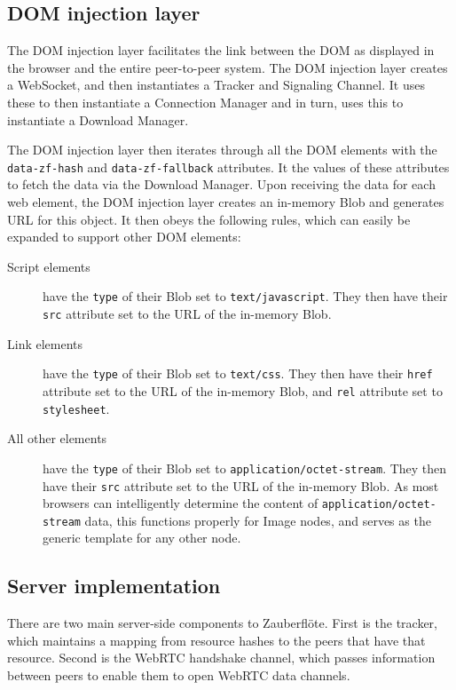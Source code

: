 \documentclass[letterpaper,twocolumn,10pt]{article}
\newcommand{\zbf}{Zauberfl\"{o}te\xspace}
\begin{document}
\subsection{DOM injection layer}
The DOM injection layer facilitates the link between the DOM as displayed in the browser and the entire peer-to-peer system. The DOM injection layer creates a WebSocket, and then instantiates a Tracker and Signaling Channel. It uses these to then instantiate a Connection Manager and in turn, uses this to instantiate a Download Manager.

The DOM injection layer then iterates through all the DOM elements with the \texttt{data-zf-hash} and \texttt{data-zf-fallback} attributes. It the values of these attributes to fetch the data via the Download Manager. Upon receiving the data for each web element, the DOM injection layer creates an in-memory Blob and generates URL for this object. It then obeys the following rules, which can easily be expanded to support other DOM elements:

\begin{description}
\item[Script elements] have the \texttt{type} of their Blob set to \texttt{text/javascript}. They then have their \texttt{src} attribute set to the URL of the in-memory Blob.
\item[Link elements] have the \texttt{type} of their Blob set to \texttt{text/css}. They then have their \texttt{href} attribute set to the URL of the in-memory Blob, and \texttt{rel} attribute set to \texttt{stylesheet}.
\item[All other elements] have the \texttt{type} of their Blob set to \texttt{application/octet-stream}. They then have their \texttt{src} attribute set to the URL of the in-memory Blob. As most browsers can intelligently determine the content of \texttt{application/octet-stream} data, this functions properly for Image nodes, and serves as the generic template for any other node.
\end{description}

\subsection{Server implementation}

There are two main server-side components to \zbf. First is the tracker,
which maintains a mapping from resource hashes to the peers that have that
resource. Second is the WebRTC handshake channel, which passes information
between peers to enable them to open WebRTC data channels.
\end{document}

